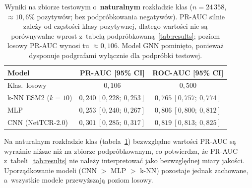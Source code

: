 \documentclass{SGGW-thesis}
\begin{document}
\begin{table}[htbp]
\centering
\small
\caption{Wyniki na zbiorze testowym o~\textbf{naturalnym} rozkładzie klas
($n{=}24\,358$, ${\approx}10{,}6\%$ pozytywów; bez podpróbkowania negatywów). PR-AUC silnie
zależy od częstości klasy pozytywnej, dlatego wartości nie są porównywalne wprost z~tabelą
podpróbkowaną~\ref{tab:results}; poziom losowy PR-AUC wynosi tu ${\approx}0{,}106$. Model GNN
pominięto, ponieważ dysponuje podgrafami wyłącznie dla podpróbki testowej.}
\label{tab:natural}
\begin{tabular}{lcc}
\toprule
\textbf{Model} & \textbf{PR-AUC [95\% CI]} & \textbf{ROC-AUC [95\% CI]} \\
\midrule
Klas.\ losowy     & $0{,}106$                  & $0{,}500$ \\
k-NN ESM2 ($k{=}10$) & $0{,}240\ [0{,}228;\ 0{,}253]$ & $0{,}765\ [0{,}757;\ 0{,}774]$ \\
MLP               & $0{,}253\ [0{,}240;\ 0{,}267]$ & $0{,}806\ [0{,}800;\ 0{,}812]$ \\
CNN (NetTCR-2.0)  & $0{,}301\ [0{,}285;\ 0{,}317]$ & $0{,}819\ [0{,}813;\ 0{,}825]$ \\
\bottomrule
\end{tabular}
\end{table}

Na naturalnym rozkładzie klas (tabela~\ref{tab:natural}) bezwzględne wartości PR-AUC są
wyraźnie niższe niż na zbiorze podpróbkowanym, co potwierdza, że PR-AUC z~tabeli~\ref{tab:results}
nie należy interpretować jako bezwzględnej miary jakości. Uporządkowanie modeli
(CNN $>$ MLP $>$ k-NN) pozostaje jednak zachowane, a~wszystkie modele przewyższają poziom losowy.

\begin{table}[htbp]
\centering
\small
\caption{Ablation study architektury GNN: wpływ głębokości sieci ($L$) i~typu konwolucji
na jakość predykcji. Wszystkie warianty trenowane z~identycznym seedem (42) i~hiperparametrami.
Wyniki na zbiorze testowym przy ${\approx}33\%$ pozytywów.
GATConv: \textit{drop\_rate}${=}0{,}0$, \textit{use\_bn}${=}$False.
}
\label{tab:ablation_gnn}
\end{table}
\end{document}
